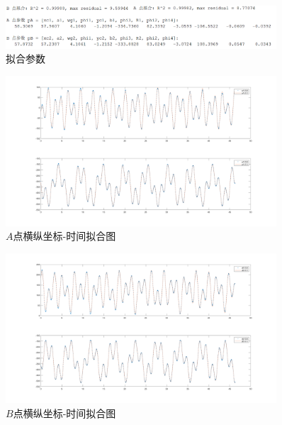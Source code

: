 \documentclass[11pt]{article}
\begin{document}
\begin{enumerate}
\begin{enumerate}
        \begin{figure}[H]
            \centering
            \includegraphics[width=0.9\textwidth]{Figs/Ex1.nums.png}
            \caption{拟合参数}
        \end{figure}
        \vspace{-0.7cm}
        \begin{figure}[H]
            \centering
            \includegraphics[width=0.9\textwidth]{Figs/Ex1.A.png}
            \vspace{-0.5cm}
            \caption{$A$点横纵坐标-时间拟合图}
        \end{figure}
        \vspace{-0.7cm}
        \begin{figure}[H]
            \centering
            \includegraphics[width=0.9\textwidth]{Figs/Ex1.B.png}
            \vspace{-0.5cm}
            \caption{$B$点横纵坐标-时间拟合图}
        \end{figure}
        

\end{enumerate}
\end{enumerate}
\end{document}
